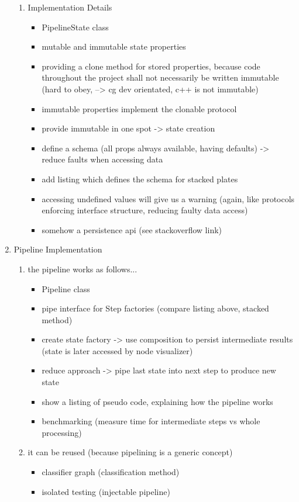 \documentclass[../ClassicThesis.tex]{subfiles}
\begin{document}
\begin{enumerate}
\begin{enumerate}
  \item Implementation Details
    \begin{itemize}
    \item PipelineState class
    \item mutable and immutable state properties
    \item providing a clone method for stored properties, because code throughout the project shall
      not necessarily be written immutable (hard to obey, --> cg dev orientated,
      c++ is not immutable)
    \item immutable properties implement the clonable protocol
    \item provide immutable in one spot -> state creation
    \item define a schema (all props always available, having defaults) ->
      reduce faults when accessing data
    \item add listing which defines the schema for stacked plates
    \item accessing undefined values will give us a warning (again, like
      protocols enforcing interface structure, reducing faulty data access)
    \item somehow a persistence api (see stackoverflow link)
    \end{itemize}
  \end{enumerate}

\item Pipeline Implementation

  \begin{enumerate}
  \item the pipeline works as follows...
    \begin{itemize}
    \item Pipeline class
    \item pipe interface for Step factories (compare listing above, stacked method)
    \item create state factory -> use composition to persist intermediate results
      (state is later accessed by node visualizer)
    \item reduce approach -> pipe last state into next step to produce new state
    \item show a listing of pseudo code, explaining how the pipeline works
    \item benchmarking (measure time for intermediate steps vs whole processing)
    \end{itemize}

  \item it can be reused (because pipelining is a generic concept)
    \begin{itemize}
    \item classifier graph (classification method)
    \item isolated testing (injectable pipeline)
    \end{itemize}
  \end{enumerate}

\end{enumerate}
\end{document}
